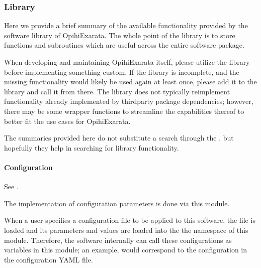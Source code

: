 \documentclass[letterpaper,11pt,english]{sphinxmanual}
\begin{document}
\subsubsection{Library}
\label{\detokenize{technical/architecture/library:library}}\label{\detokenize{technical/architecture/library:technical-architecture-library}}\label{\detokenize{technical/architecture/library::doc}}
\sphinxAtStartPar
Here we provide a brief summary of the available functionality provided by the
software library of OpihiExarata. The whole point of the library is to store
functions and subroutines which are useful across the entire software
package.

\sphinxAtStartPar
When developing and maintaining OpihiExarata itself, please utilize the library
before implementing something custom. If the library is incomplete, and the
missing functionality would likely be used again at least once, please add it
to the library and call it from there. The library does not typically
reimplement functionality already implemented by third\sphinxhyphen{}party package
dependencies; however, there may be some wrapper functions to streamline
the capabilities thereof to better fit the use cases for OpihiExarata.

\sphinxAtStartPar
The summaries provided here do not substitute a search through the
{\hyperref[\detokenize{index:home-code-manual}]{}}, but hopefully they help in searching for library
functionality.


\paragraph{Configuration}
\label{\detokenize{technical/architecture/library:configuration}}
\sphinxAtStartPar
See {\hyperref[\detokenize{code/opihiexarata.library.config:module-opihiexarata.library.config}]{}}.

\sphinxAtStartPar
The implementation of configuration parameters is done via this module.

\sphinxAtStartPar
When a user specifies a configuration file to be applied to this software, the
file is loaded and its parameters and values are loaded into the the
namespace of this module. Therefore, the software internally can call these
configurations as variables in this module; an example,
 would correspond to the  configuration
in the configuration YAML file.
\end{document}

